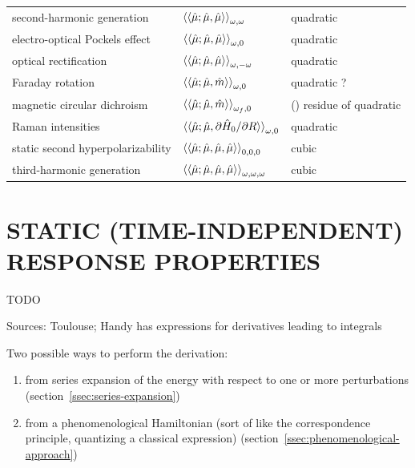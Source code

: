 \documentclass[%
class = book,%
crop = false,%
float = true,%
multi = true,%
preview = false,%
]{standalone}
\newcommand{\caps}[1]{\uppercase{#1}}
\begin{document}
\begin{table}
\begin{tabular}{lll}
    second-harmonic generation        & \( \braket{\braket{\hat{\mu};\hat{\mu},\hat{\mu}}}_{\omega,\omega} \)                  & quadratic \\
    electro-optical Pockels effect    & \( \braket{\braket{\hat{\mu};\hat{\mu},\hat{\mu}}}_{\omega,0} \)                       & quadratic \\
    optical rectification             & \( \braket{\braket{\hat{\mu};\hat{\mu},\hat{\mu}}}_{\omega,-\omega} \)                 & quadratic \\
    Faraday rotation                  & \( \braket{\braket{\hat{\mu};\hat{\mu},\hat{m}}}_{\omega,0} \)                         & quadratic ? \\
    magnetic circular dichroism       & \( \braket{\braket{\hat{\mu};\hat{\mu},\hat{m}}}_{\omega_{f},0} \)                     & () residue of quadratic \\
    Raman intensities                 & \( \braket{\braket{\hat{\mu};\hat{\mu},\partial\hat{H}_{0}/\partial R}}_{\omega,0} \)  & quadratic \\
    \midrule
    static second hyperpolarizability & \( \braket{\braket{\hat{\mu};\hat{\mu},\hat{\mu},\hat{\mu}}}_{0,0,0} \)                & cubic \\
    third-harmonic generation         & \( \braket{\braket{\hat{\mu};\hat{\mu},\hat{\mu},\hat{\mu}}}_{\omega,\omega,\omega} \) & cubic \\
    \bottomrule
  \end{tabular}
\end{table}

\section{\texorpdfstring{\caps{Static (time-independent) response properties}}{Static (time-independent) response properties}}
\label{sec:static-properties}

TODO

Sources: Toulouse; Handy has expressions for derivatives leading to integrals

Two possible ways to perform the derivation:

\begin{enumerate}
\item from series expansion of the energy with respect to one or more perturbations (section~\ref{ssec:series-expansion})
\item from a phenomenological Hamiltonian (sort of like the correspondence principle, quantizing a classical expression) (section~\ref{ssec:phenomenological-approach})
\end{enumerate}
\end{document}
